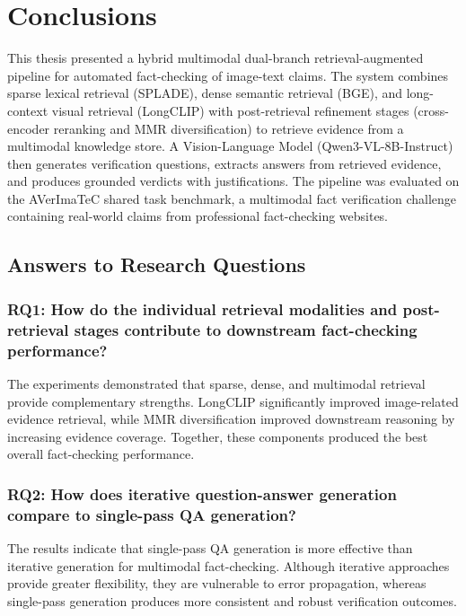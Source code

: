 \chapter{Conclusions}
\label{ch:conclusion}

This thesis presented a hybrid multimodal dual-branch retrieval-augmented pipeline for automated fact-checking of image-text claims. The system combines sparse lexical retrieval (SPLADE), dense semantic retrieval (BGE), and long-context visual retrieval (LongCLIP) with post-retrieval refinement stages (cross-encoder reranking and MMR diversification) to retrieve evidence from a multimodal knowledge store. A Vision-Language Model (Qwen3-VL-8B-Instruct) then generates verification questions, extracts answers from retrieved evidence, and produces grounded verdicts with justifications. The pipeline was evaluated on the AVerImaTeC shared task benchmark, a multimodal fact verification challenge containing real-world claims from professional fact-checking websites.

\section{Answers to Research Questions}

\subsection*{RQ1: How do the individual retrieval modalities and post-retrieval stages contribute to downstream fact-checking performance?}

The experiments demonstrated that sparse, dense, and multimodal retrieval provide complementary strengths. LongCLIP significantly improved image-related evidence retrieval, while MMR diversification improved downstream reasoning by increasing evidence coverage. Together, these components produced the best overall fact-checking performance.

\subsection*{RQ2: How does iterative question-answer generation compare to single-pass QA generation?}

The results indicate that single-pass QA generation is more effective than iterative generation for multimodal fact-checking. Although iterative approaches provide greater flexibility, they are vulnerable to error propagation, whereas single-pass generation produces more consistent and robust verification outcomes.

